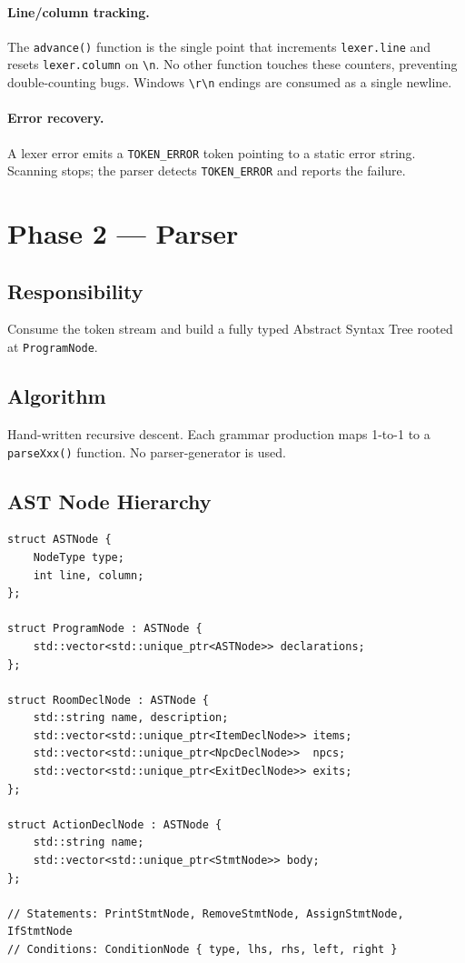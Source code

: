 \documentclass[12pt, a4paper]{article}
\begin{document}
\paragraph{Line/column tracking.}
The \texttt{advance()} function is the single point that increments
\texttt{lexer.line} and resets \texttt{lexer.column} on \texttt{\textbackslash n}.
No other function touches these counters, preventing double-counting bugs.
Windows \texttt{\textbackslash r\textbackslash n} endings are consumed as a single newline.

\paragraph{Error recovery.}
A lexer error emits a \texttt{TOKEN\_ERROR} token pointing to a static error string.
Scanning stops; the parser detects \texttt{TOKEN\_ERROR} and reports the failure.

\section{Phase 2 --- Parser}

\subsection{Responsibility}
Consume the token stream and build a fully typed Abstract Syntax Tree
rooted at \texttt{ProgramNode}.

\subsection{Algorithm}
Hand-written recursive descent. Each grammar production maps 1-to-1 to a
\texttt{parseXxx()} function. No parser-generator is used.

\subsection{AST Node Hierarchy}

\begin{lstlisting}[style=cpp, caption={AST node types (simplified)}]
struct ASTNode {
    NodeType type;
    int line, column;
};

struct ProgramNode : ASTNode {
    std::vector<std::unique_ptr<ASTNode>> declarations;
};

struct RoomDeclNode : ASTNode {
    std::string name, description;
    std::vector<std::unique_ptr<ItemDeclNode>> items;
    std::vector<std::unique_ptr<NpcDeclNode>>  npcs;
    std::vector<std::unique_ptr<ExitDeclNode>> exits;
};

struct ActionDeclNode : ASTNode {
    std::string name;
    std::vector<std::unique_ptr<StmtNode>> body;
};

// Statements: PrintStmtNode, RemoveStmtNode, AssignStmtNode, IfStmtNode
// Conditions: ConditionNode { type, lhs, rhs, left, right }
\end{lstlisting}
\end{document}
